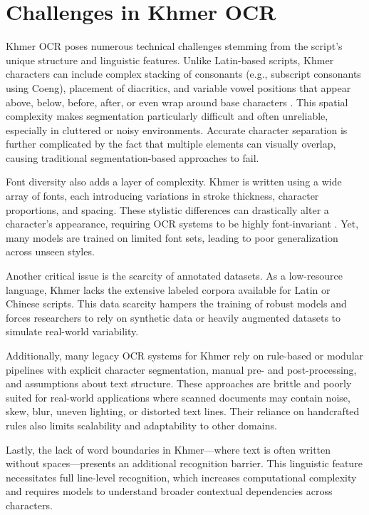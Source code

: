 \section{Challenges in Khmer OCR}
\label{sec:datasets}

Khmer OCR poses numerous technical challenges stemming from the script's unique structure and 
linguistic features. Unlike Latin-based scripts, Khmer characters can include complex stacking 
of consonants (e.g., subscript consonants using Coeng), placement of diacritics, and variable vowel 
positions that appear above, below, before, after, or even wrap around base characters \citep{buoy2021seq2seq}. 
This spatial complexity makes segmentation particularly difficult and often unreliable, 
especially in cluttered or noisy environments. Accurate character separation is further complicated 
by the fact that multiple elements can visually overlap, causing traditional segmentation-based 
approaches to fail.

Font diversity also adds a layer of complexity. Khmer is written using a wide array of fonts, each 
introducing variations in stroke thickness, character proportions, and spacing. These stylistic 
differences can drastically alter a character's appearance, requiring OCR systems to be highly 
font-invariant \citep{buoy2021seq2seq}. Yet, many models are trained on limited font sets, leading 
to poor generalization across unseen styles.

Another critical issue is the scarcity of annotated datasets. As a low-resource language, Khmer lacks 
the extensive labeled corpora available for Latin or Chinese scripts. This data scarcity hampers the 
training of robust models and forces researchers to rely on synthetic data or heavily augmented datasets 
to simulate real-world variability.

Additionally, many legacy OCR systems for Khmer rely on rule-based or modular pipelines with explicit 
character segmentation, manual pre- and post-processing, and assumptions about text structure. These 
approaches are brittle and poorly suited for real-world applications where scanned documents may contain 
noise, skew, blur, uneven lighting, or distorted text lines. Their reliance on handcrafted rules also 
limits scalability and adaptability to other domains.

Lastly, the lack of word boundaries in Khmer—where text is often written without spaces—presents an 
additional recognition barrier. This linguistic feature necessitates full line-level recognition, 
which increases computational complexity and requires models to understand broader contextual dependencies 
across characters.



